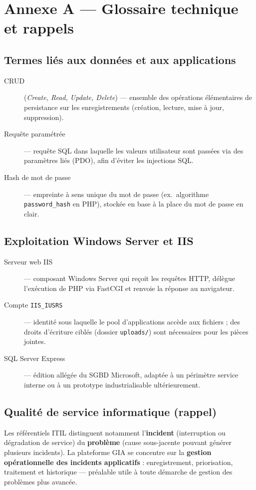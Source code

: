 \chapter{Annexe A — Glossaire technique et rappels}

\section{Termes liés aux données et aux applications}
\begin{description}
    \item[CRUD] (\textit{Create, Read, Update, Delete}) — ensemble des opérations élémentaires
    de persistance sur les enregistrements (création, lecture, mise à jour, suppression).
    \item[Requête paramétrée] — requête SQL dans laquelle les valeurs utilisateur sont passées
    via des paramètres liés (PDO), afin d'éviter les injections SQL.
    \item[Hash de mot de passe] — empreinte à sens unique du mot de passe (ex.\
    algorithme \texttt{password\_hash} en PHP), stockée en base à la place du mot de passe en clair.
\end{description}

\section{Exploitation Windows Server et IIS}
\begin{description}
    \item[Serveur web IIS] — composant Windows Server qui reçoit les requêtes HTTP, délègue
    l'exécution de PHP via FastCGI et renvoie la réponse au navigateur.
    \item[Compte \texttt{IIS\_IUSRS}] — identité sous laquelle le pool d'applications accède
    aux fichiers ; des droits d'écriture ciblés (dossier \texttt{uploads/}) sont nécessaires pour
    les pièces jointes.
    \item[SQL Server Express] — édition allégée du SGBD Microsoft, adaptée à un périmètre
    service interne ou à un prototype industrialisable ultérieurement.
\end{description}

\section{Qualité de service informatique (rappel)}
Les référentiels ITIL distinguent notamment l'\textbf{incident} (interruption ou dégradation de
service) du \textbf{problème} (cause sous-jacente pouvant générer plusieurs incidents). La
plateforme GIA se concentre sur la \textbf{gestion opérationnelle des incidents applicatifs} :
enregistrement, priorisation, traitement et historique — préalable utile à toute démarche de
gestion des problèmes plus avancée.
